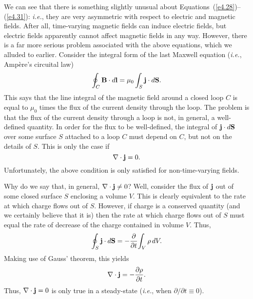 We can see that there is something slightly unusual about 
Equations~(\ref{e4.28})--(\ref{e4.31}): {\em i.e.}, they
are very  asymmetric with respect to electric and magnetic fields. After all, time-varying magnetic fields
can induce electric fields, but electric fields apparently 
cannot affect magnetic fields
in any way. However, there is a far more serious problem associated
with the above equations,
which we alluded to earlier. Consider the integral form of the last 
Maxwell equation
({\em i.e.}, Amp\`{e}re's circuital law)
\begin{equation}\label{e4.32}
\oint_C {\bf B} \cdot d{\bf l} = \mu_0 \int_S {\bf j}\cdot d{\bf S}.
\end{equation}
This says that the line integral of the magnetic field around a closed loop
$C$ is equal to $\mu_0$ times the flux of the current density through the loop.
The problem is that the flux of the current density through  a loop is not,
in general, a well-defined quantity.
In order for the  flux to be well-defined,  the integral of
${\bf j}\cdot d{\bf S}$ over some surface $S$ attached to a loop
$C$ must depend
on $C$, but not on the details of $S$. This is only the case if
\begin{equation}
\nabla \cdot {\bf j} = 0.
\end{equation}
Unfortunately, the above  condition is only
satisfied for non-time-varying fields. 

Why do we say that, in general,  $\nabla\cdot{\bf j} \neq 0$? Well, consider
the flux of ${\bf j}$ out of some closed surface $S$ enclosing a
volume $V$. This is clearly equivalent to the rate at which 
 charge flows out of $S$. However, if charge is a conserved quantity
(and we certainly 
believe that it is) then the rate at which  charge flows out of $S$ must
 equal
the rate of decrease of the charge contained in volume $V$. Thus,
\begin{equation}
\oint_S {\bf j} \cdot d{\bf S} = - \frac{\partial}{\partial t}\!
\int_V \rho\,dV.
\end{equation}
Making use of Gauss' theorem, this yields
\begin{equation}\label{e4.35}
\nabla\cdot{\bf j} = -\frac{\partial \rho}{\partial t}.
\end{equation}
Thus,
$\nabla\cdot{\bf j} =0$ is only true  in a steady-state ({\em i.e.},
when $\partial/\partial t \equiv 0$). 

